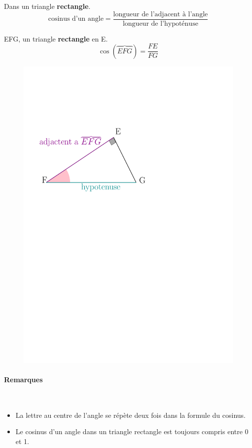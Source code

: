\documentclass[paper=a4, fontsize=11pt]{scrartcl} %
\begin{document}
\begin{multicols}{2}
  \begin{Definition}
    Dans un triangle \textbf{rectangle}.\\
    $$\text{cosinus d'un angle} = \dfrac{\text{longueur de l'adjacent à l'angle}}{\text{longueur de l'hypoténuse}}$$ 
  \end{Definition}

  \begin{Definition}
    EFG,  un triangle \textbf{rectangle} en E.\\
    $$\cos(\overbrace{EFG}) = \dfrac{FE}{FG}$$

  \end{Definition}

  \begin{figure}[H]
	  \centering
	  \includegraphics[width=0.8\linewidth]{sources/2/tri-EFG.pdf}
  \end{figure}

\end{multicols}

\paragraph{Remarques}~~\\
\begin{itemize}
\item La lettre au centre de l'angle se répète deux fois dans la formule du cosinus.
\item Le cosinus d'un angle dans un triangle rectangle est toujours compris entre 0 et 1.
\end{itemize}
\end{document}
